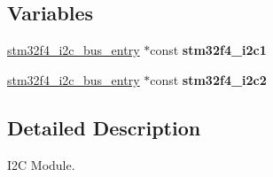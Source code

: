 \subsection*{Variables}
\begin{DoxyCompactItemize}
\item 
\mbox{\label{group__stm32f4__i2c_ga9f60f4c9b5d77c0b4e0f18eab859e1dc}} 
\mbox{\hyperlink{structstm32f4__i2c__bus__entry}{stm32f4\+\_\+i2c\+\_\+bus\+\_\+entry}} $\ast$const {\bfseries stm32f4\+\_\+i2c1}
\item 
\mbox{\label{group__stm32f4__i2c_gaf941434ec172fed91abb0f6d93c75872}} 
\mbox{\hyperlink{structstm32f4__i2c__bus__entry}{stm32f4\+\_\+i2c\+\_\+bus\+\_\+entry}} $\ast$const {\bfseries stm32f4\+\_\+i2c2}
\end{DoxyCompactItemize}


\subsection{Detailed Description}
I2C Module. 

